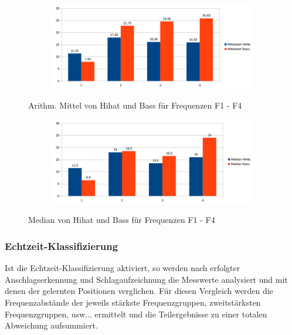 \begin{figure}[H]
\centering
\begin{subfigure}{.5\textwidth}
		\includegraphics[scale=0.5]{figures/Mittelwert_2.png}
\end{subfigure}
\caption{Arithm. Mittel von Hihat und Bass für Frequenzen F1 - F4}
\label{fig:FFT_Mittelwerte}
\end{figure}


\begin{figure}[H]
\centering
\begin{subfigure}{.5\textwidth}
		\includegraphics[scale=0.5]{figures/Median_2.png}
\end{subfigure}
\caption{Median von Hihat und Bass für Frequenzen F1 - F4}
\label{fig:FFT_Median}
\end{figure}


\subsubsection*{Echtzeit-Klassifizierung}
Ist die Echtzeit-Klassifizierung aktiviert, so werden nach erfolgter Anschlagserkennung und Schlagaufzeichnung die Messwerte analysiert und mit denen der gelernten Positionen verglichen. 
Für diesen Vergleich werden die Frequenzabstände der jeweils stärkste Frequenzgruppen, zweitstärksten Frequenzgruppen, usw... ermittelt und die Teilergebnisse zu einer totalen Abweichung aufsummiert.

